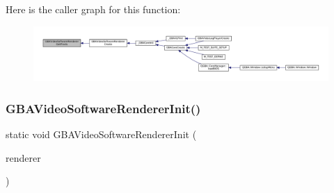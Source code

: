 Here is the caller graph for this function\+:
\nopagebreak
\begin{figure}[H]
\begin{center}
\leavevmode
\includegraphics[width=350pt]{video-software_8c_a1f3ab2c0fe8d2b4179230c474a0e8ee8_icgraph}
\end{center}
\end{figure}
\mbox{\label{video-software_8c_af96caae6a353b68c77615b83bfee10cb}} 
\subsubsection{\texorpdfstring{G\+B\+A\+Video\+Software\+Renderer\+Init()}{GBAVideoSoftwareRendererInit()}}
{\footnotesize\ttfamily static void G\+B\+A\+Video\+Software\+Renderer\+Init (\begin{DoxyParamCaption}\item[{struct G\+B\+A\+Video\+Renderer $\ast$}]{renderer }\end{DoxyParamCaption})\hspace{0.3cm}{\ttfamily [static]}}

